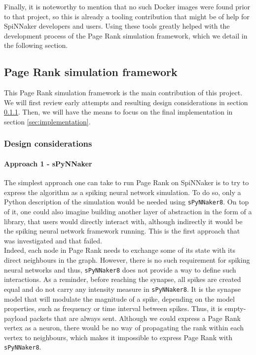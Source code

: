 Finally, it is noteworthy to mention that no such Docker images were found prior to that project, so this is already a tooling contribution that might be of help for SpiNNaker developers and users. Using these tools greatly helped with the development process of the Page Rank simulation framework, which we detail in the following section. \\

\subsection{Page Rank simulation framework} \label{sec:prsf}

This Page Rank simulation framework is the main contribution of this project. We will first review early attempts and resulting design considerations in section \ref{sec:des}. Then, we will have the means to focus on the final implementation in section \ref{sec:implementation}.

\subsubsection{Design considerations} \label{sec:des}

\paragraph{Approach 1 - sPyNNaker}

The simplest approach one can take to run Page Rank on SpiNNaker is to try to express the algorithm as a spiking neural network simulation. To do so, only a Python description of the simulation would be needed using \texttt{sPyNNaker8}. On top of it, one could also imagine building another layer of abstraction in the form of a library, that users would directly interact with, although indirectly it would be the spiking neural network framework running. This is the first approach that was investigated and that failed. \\

Indeed, each node in Page Rank needs to exchange some of its state with its direct neighbours in the graph. However, there is no such requirement for spiking neural networks and thus, \texttt{sPyNNaker8} does not provide a way to define such interactions. As a reminder, before reaching the synapse, all spikes are created equal and do not carry any intensity measure in \texttt{sPyNNaker8}. It is the synapse model that will modulate the magnitude of a spike, depending on the model properties, such as frequency or time interval between spikes. Thus, it is empty-payload packets that are always sent. Although we could express a Page Rank vertex as a neuron, there would be no way of propagating the rank within each vertex to neighbours, which makes it impossible to express Page Rank with \texttt{sPyNNaker8}. \\

